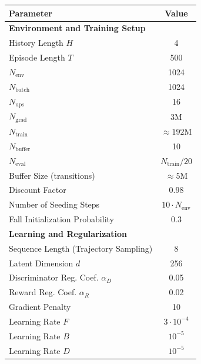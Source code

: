 \begin{table}[h]
    \centering
    \footnotesize %
    \begin{tabular}{lc}
    \toprule
    \textbf{Parameter} & \textbf{Value} \\
    \midrule
    \multicolumn{2}{l}{\textbf{Environment and Training Setup}} \\
    \midrule
    History Length $H$                  & 4 \\
    Episode Length $T$                  & 500 \\
    $N_{\mathrm{env}}$                  & 1024 \\
    $N_{\mathrm{batch}}$                & 1024 \\
    $N_{\mathrm{ups}}$                  & 16 \\
    $N_{\mathrm{grad}}$                 & 3M \\
    $N_{\mathrm{train}}$                & $\approx 192$M \\
    $N_{\mathrm{buffer}}$               & 10 \\
    $N_{\mathrm{eval}}$                 & $N_{\mathrm{train}}/20$ \\
    Buffer Size (transitions)           & $\approx 5$M \\
    Discount Factor                     & 0.98 \\
    Number of Seeding Steps             & $10 \cdot N_{\mathrm{env}}$ \\
    Fall Initialization Probability     & 0.3 \\
    \midrule
    \multicolumn{2}{l}{\textbf{Learning and Regularization}} \\
    \midrule
    Sequence Length (Trajectory Sampling) & 8 \\
    Latent Dimension $d$                 & 256 \\
    Discriminator Reg. Coef. $\alpha_D$  & 0.05 \\
    Reward Reg. Coef. $\alpha_R$         & 0.02 \\
    Gradient Penalty                     & 10 \\
    Learning Rate $F$                    & $3 \cdot 10^{-4}$ \\
    Learning Rate $B$                    & $10^{-5}$ \\
    Learning Rate $D$                    & $10^{-5}$ \\

\end{tabular}
\end{table}
